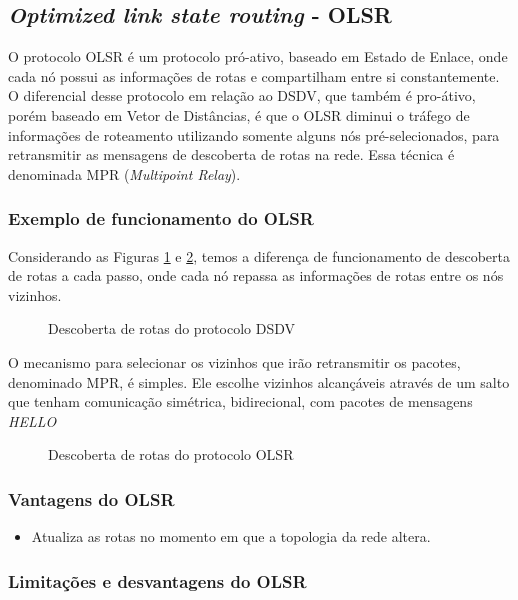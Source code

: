 \subsection{\textit{Optimized link state routing} - OLSR}\label{subOLSR}
O protocolo OLSR \cite{rfc3626} \'e um protocolo pr\'o-ativo, baseado em Estado de Enlace, onde cada n\'o possui as informa\c{c}\~oes de rotas e compartilham entre si constantemente. 
O diferencial desse protocolo em rela\c{c}\~ao ao DSDV, que tamb\'em \'e pro-\'ativo, por\'em baseado em Vetor de Dist\^ancias, \'e que o OLSR diminui o tr\'afego de informa\c{c}\~oes de roteamento utilizando somente alguns n\'os pr\'e-selecionados, para retransmitir as mensagens de descoberta de rotas na rede.
Essa t\'ecnica \'e denominada MPR (\textit{Multipoint Relay}).

\subsubsection{Exemplo de funcionamento do OLSR}
Considerando as Figuras \ref{fig:olsrComum} e \ref{fig:olsrOperation}, temos a diferen\c{c}a de funcionamento de descoberta de rotas a cada passo, onde cada n\'o repassa as informa\c{c}\~oes de rotas entre os n\'os vizinhos.

\begin{figure}[H]
	\centering
	\label{subfig:olsrStep11}
	\label{subfig:olsrStep12}
	\label{subfig:olsrStep13}
	\label{subfig:olsrStep14}	
	\caption{Descoberta de rotas do protocolo DSDV}
	\label{fig:olsrComum}
\end{figure}

O mecanismo para selecionar os vizinhos que ir\~ao retransmitir os pacotes, denominado MPR, \'e simples. Ele escolhe vizinhos alcan\c{c}\'aveis atrav\'es de um salto que tenham comunica\c{c}\~ao sim\'etrica, bidirecional, com pacotes de mensagens \textit{HELLO}

\begin{figure}[H]
	\centering
	\label{subfig:olsrStep21}
	\label{subfig:olsrStep22}
	\label{subfig:olsrStep23}
	\label{subfig:olsrStep24}	
	\caption{Descoberta de rotas do protocolo OLSR}
	\label{fig:olsrOperation}
\end{figure}

\subsubsection{Vantagens do OLSR}
\begin{itemize}
	\item Atualiza as rotas no momento em que a topologia da rede altera.
\end{itemize}

\subsubsection{Limita\c{c}\~oes e desvantagens do OLSR}
